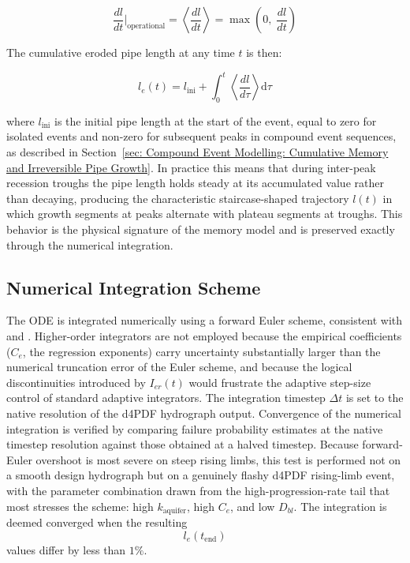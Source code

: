$$\frac{dl}{dt}\bigg|_\mathrm{operational} = \left\langle\frac{dl}{dt}\right\rangle = \max\!\left(0,\; \frac{dl}{dt}\right)$$

The cumulative eroded pipe length at any time $t$ is then:

$$l_e(t) = l_\mathrm{ini} + \int_0^{t} \left\langle\frac{dl}{d\tau}\right\rangle \mathrm{d}\tau$$

where $l_\mathrm{ini}$ is the initial pipe length at the start of the event, equal to zero for isolated events and non-zero for subsequent peaks in compound event sequences, as described in Section~\ref{sec: Compound Event Modelling: Cumulative Memory and Irreversible Pipe Growth}. In practice this means that during inter-peak recession troughs the pipe length holds steady at its accumulated value rather than decaying, producing the characteristic staircase-shaped trajectory $l(t)$ in which growth segments at peaks alternate with plateau segments at troughs. This behavior is the physical signature of the memory model and is preserved exactly through the numerical integration.

\subsection{Numerical Integration Scheme}
\label{subsec: Numerical Integration Scheme}

The ODE is integrated numerically using a forward Euler scheme, consistent with \textcite{pol_compgeo_2024} and \textcite{pol_sie_2024}. Higher-order integrators are not employed because the empirical coefficients ($C_e$, the regression exponents) carry uncertainty substantially larger than the numerical truncation error of the Euler scheme, and because the logical discontinuities introduced by $I_{er}(t)$ would frustrate the adaptive step-size control of standard adaptive integrators. The integration timestep $\Delta t$ is set to the native resolution of the d4PDF hydrograph output. Convergence of the numerical integration is verified by comparing failure probability estimates at the native timestep resolution against those obtained at a halved timestep. Because forward-Euler overshoot is most severe on steep rising limbs, this test is performed not on a smooth design hydrograph but on a genuinely flashy d4PDF rising-limb event, with the parameter combination drawn from the high-progression-rate tail that most stresses the scheme: high $k_\mathrm{aquifer}$, high $C_e$, and low $D_{bl}$. The integration is deemed converged when the resulting
\[
l_e(t_\mathrm{end})
\]
values differ by less than $1\%$.

